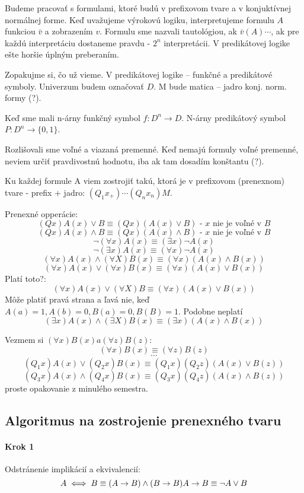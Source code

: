 Budeme pracovať s formulami, ktoré budú v prefixovom tvare a v konjuktívnej normálnej
forme. Keď uvažujeme výrokovú logiku, interpretujeme formulu $A$ funkciou $\bar{v}$
a zobrazením $v$. Formulu sme nazvali tautológiou, ak $\bar{v}(A)\cdots$, ak pre každú
interpretáciu dostaneme pravdu - $2^n$ interpretácii. V predikátovej logike ešte horšie úplným preberaním.

Zopakujme si, čo už vieme. V predikátovej logike -- funkčné a predikátové symboly. Univerzum budem označovať $D$.
M bude matica -- jadro konj. norm. formy (?).

Keď sme mali n-árny funkčný symbol $f: D^n \rightarrow D$. N-árny predikátový symbol
$P: D^n \rightarrow \{0,1\}$.

Rozlišovali sme voľné a viazaná premenné. Keď nemajú formuly voľné premenné, neviem
určiť pravdivostnú hodnotu, iba ak tam dosadím konštantu (?).

Ku každej formule A viem zostrojiť takú, ktorá je v prefixovom (prenexnom) tvare -
prefix + jadro: $(Q_1 x_+)\cdots(Q_n x_n)M$.

Prenexné opperácie:
$$(Qx)A(x) \lor B \equiv (Qx)(A(x) \lor B) \mbox{ - $x$ nie je voľné v $B$} $$
$$ (Qx)A(x) \land B \equiv (Qx)(A(x) \land B) \mbox{ - $x$ nie je voľné v $B$} $$
$$ \neg (\forall x) A(x) \equiv (\exists x) \neg A(x) $$
$$ \neg (\exists x) A(x) \equiv (\forall x) \neg A(x) $$
$$ (\forall x) A(x) \land (\forall X) B(x) \equiv (\forall x) (A(x) \land B(x)) $$
$$ (\forall x) A(x) \lor (\forall x) B(x) \equiv (\forall x) (A(x) \lor B(x)) $$
Platí toto?:
$$(\forall x) A(x) \lor (\forall X) B \equiv (\forall x) (A(x) \lor B(x))$$
Môže platiť pravá strana a ľavá nie, keď $A(a)=1, A(b)=0, B(a)=0, B(B)=1$.
Podobne neplatí
$$(\exists x) A(x) \land (\exists X) B(x) \equiv (\exists x) (A(x) \land B(x))$$

Vezmem si $(\forall x)B(x) a (\forall z) B(z)$:
$$(\forall x) B(x) \equiv (\forall z) B(z) $$
$$\cdots$$
$$ (Q_1 x)A(x) \lor (Q_2 x)B(x) \equiv (Q_1 x)(Q_2 z)(A(x) \lor B(z)) $$
$$ (Q_3 x)A(x) \land (Q_4 x)B(x) \equiv (Q_3 x)(Q_4 z)(A(x) \land B(z)) $$
proste opakovanie z minulého semestra.

\subsection{Algoritmus na zostrojenie prenexného tvaru}
\paragraph{Krok 1} Odstránenie implikácií a ekvivalencií:
$$ 
	A \iff B \equiv (A \implies B) \land (B \implies B) \\
	A \implies B \equiv \neg A \lor B
$$

